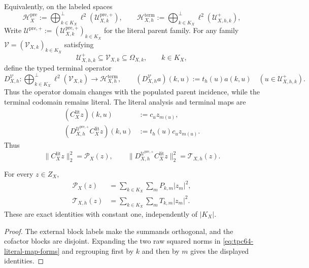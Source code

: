 Equivalently, on the labeled spaces
\begin{equation}
 \mathcal H_X^{\mathrm{pre}}
 :=
 \bigoplus_{k\in K_X}^{\perp}
 \ell^2(\mathcal U_{X,k}^{\mathrm{pre},+}),
 \qquad
 \mathcal H_{X,h}^{\mathrm{term}}
 :=
 \bigoplus_{k\in K_X}^{\perp}
 \ell^2(\mathcal U_{X,h,k}^{+}),
 \label{eq:tpc64-literal-Hilbert-spaces}
\end{equation}
Write
\(
 \mathcal U^{\mathrm{pre},+}
 :=(\mathcal U_{X,k}^{\mathrm{pre},+})_{k\in K_X}
\)
for the literal parent family.
For any family \(\mathcal V=(\mathcal V_{X,k})_{k\in K_X}\) satisfying
\[
 \mathcal U_{X,h,k}^{+}\subseteq\mathcal V_{X,k}\subseteq\Omega_{X,k},
 \qquad k\in K_X,
\]
define the typed terminal operator
\[
 D_{X,h}^{\mathcal V}:
 \bigoplus_{k\in K_X}^{\perp}\ell^2(\mathcal V_{X,k})
 \longrightarrow \mathcal H_{X,h}^{\mathrm{term}},
 \qquad
 (D_{X,h}^{\mathcal V}a)(k,u):=t_h(u)a(k,u)
 \quad(u\in\mathcal U_{X,h,k}^{+}).
\]
Thus the operator domain changes with the populated parent incidence, while
the terminal codomain remains literal.  The literal analysis and terminal
maps are
\begin{align}
 (C_X^{\mathrm{lit}}z)(k,u)
 &:=c_u z_{m(u)},
 \label{eq:tpc64-literal-analysis-map}\\
 (D_{X,h}^{\mathcal U^{\mathrm{pre},+}}C_X^{\mathrm{lit}}z)(k,u)
 &:=t_h(u)c_u z_{m(u)}.
 \label{eq:tpc64-literal-terminal-map}
\end{align}
Thus
\begin{equation}
 \|C_X^{\mathrm{lit}}z\|_2^2=\mathcal P_X(z),
 \qquad
 \|D_{X,h}^{\mathcal U^{\mathrm{pre},+}}C_X^{\mathrm{lit}}z\|_2^2
 =\mathcal T_{X,h}(z).
 \label{eq:tpc64-literal-map-forms}
\end{equation}

\begin{proposition}
\label{prop:tpc64-exact-block-disintegration}
For every \(z\in Z_X\),
\begin{align}
 \mathcal P_X(z)
 &=\sum_{k\in K_X}
   \sum_m P_{k,m}|z_m|^2,
 \label{eq:tpc64-parent-block-disintegration}\\
 \mathcal T_{X,h}(z)
 &=\sum_{k\in K_X}
   \sum_m T_{k,m}|z_m|^2.
 \label{eq:tpc64-terminal-block-disintegration}
\end{align}
These are exact identities with constant one, independently of
\(|K_X|\).
\end{proposition}

\begin{proof}
The external block labels make the summands orthogonal, and the cofactor
blocks are disjoint.  Expanding the two raw squared norms in
\eqref{eq:tpc64-literal-map-forms} and regrouping first by \(k\) and then
by \(m\) gives the displayed identities.
\end{proof}

